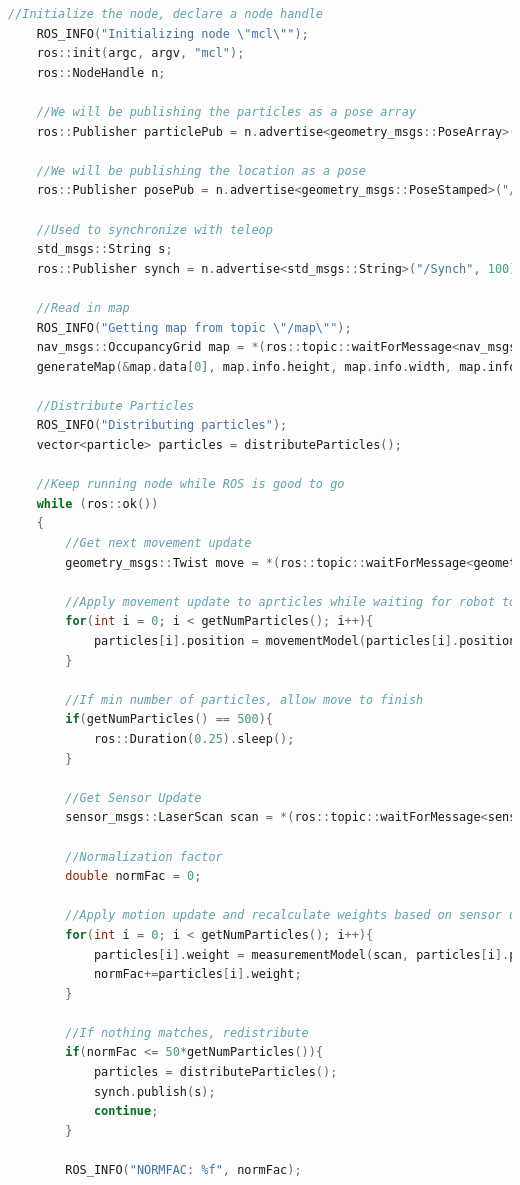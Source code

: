 \documentclass{article}
\begin{document}
\begin{appendices}
\begin{lstlisting}[language=C++]
	//Initialize the node, declare a node handle
	ROS_INFO("Initializing node \"mcl\"");	
  	ros::init(argc, argv, "mcl");
  	ros::NodeHandle n;

	//We will be publishing the particles as a pose array
	ros::Publisher particlePub = n.advertise<geometry_msgs::PoseArray>("/particles", 100);

	//We will be publishing the location as a pose
	ros::Publisher posePub = n.advertise<geometry_msgs::PoseStamped>("/position", 100);

	//Used to synchronize with teleop
	std_msgs::String s;
	ros::Publisher synch = n.advertise<std_msgs::String>("/Synch", 100);
  
 	//Read in map
	ROS_INFO("Getting map from topic \"/map\"");
 	nav_msgs::OccupancyGrid map = *(ros::topic::waitForMessage<nav_msgs::OccupancyGrid>("/map", n));
 	generateMap(&map.data[0], map.info.height, map.info.width, map.info.resolution);

	//Distribute Particles
	ROS_INFO("Distributing particles");
	vector<particle> particles = distributeParticles();

	//Keep running node while ROS is good to go
 	while (ros::ok())
 	{	
		//Get next movement update
		geometry_msgs::Twist move = *(ros::topic::waitForMessage<geometry_msgs::Twist>("cmd_vel_mux/input/teleop", n));

		//Apply movement update to aprticles while waiting for robot to finish moving
		for(int i = 0; i < getNumParticles(); i++){
			particles[i].position = movementModel(particles[i].position, move.linear.x, move.angular.z);
		}
	
		//If min number of particles, allow move to finish
		if(getNumParticles() == 500){
			ros::Duration(0.25).sleep();		
		}

 		//Get Sensor Update
		sensor_msgs::LaserScan scan = *(ros::topic::waitForMessage<sensor_msgs::LaserScan>("/scan", n));
		
		//Normalization factor
		double normFac = 0;

		//Apply motion update and recalculate weights based on sensor update, and calculate the normalization factor
		for(int i = 0; i < getNumParticles(); i++){
			particles[i].weight = measurementModel(scan, particles[i].position); 
			normFac+=particles[i].weight;
		}
		
		//If nothing matches, redistribute
		if(normFac <= 50*getNumParticles()){
			particles = distributeParticles();
			synch.publish(s);
			continue;
		}

		ROS_INFO("NORMFAC: %f", normFac);


\end{lstlisting}
\end{appendices}
\end{document}
